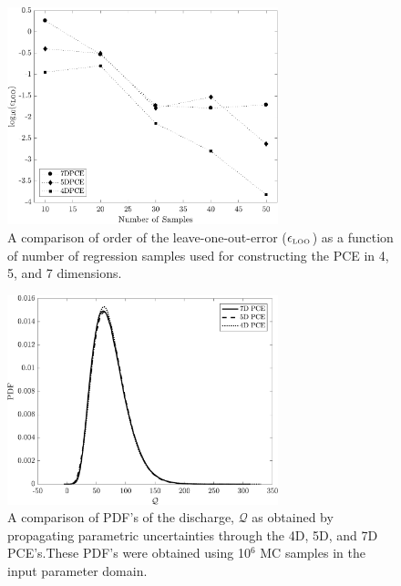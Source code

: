 \clearpage

\begin{figure}[p]
 \begin{center}
  \includegraphics[width=0.70\textwidth]{./Figures/err_samples_borehole}
\caption{A comparison of order of the leave-one-out-error 
($\epsilon_{\mbox{\tiny{LOO}}}$) as a function of number of regression samples
used for constructing the PCE in 4, 5, and 7 dimensions.}
\label{fig:conv_bore}
\end{center}
\end{figure}

\clearpage

\begin{figure}[p]
 \begin{center}
  \includegraphics[width=0.70\textwidth]{./Figures/pdf_comp_borehole}
\caption{A comparison of PDF's of the discharge, $\mathcal{Q}$ as obtained
by propagating
parametric uncertainties through the 4D, 5D, and 7D PCE's.These PDF's 
were obtained using 10$^{6}$ MC samples in the input parameter domain.} 
\label{fig:pdfcomp_bore}
\end{center}
\end{figure}

